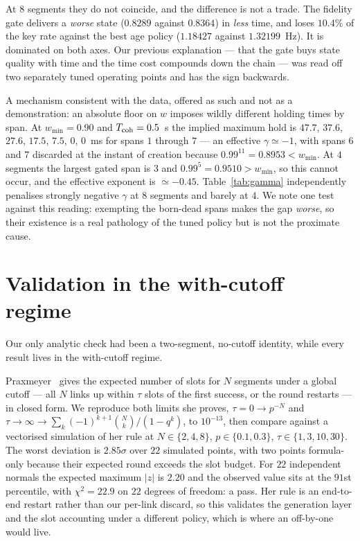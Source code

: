 \documentclass[aps,pra,twocolumn,superscriptaddress,floatfix,nofootinbib]{revtex4-2}
\begin{document}
At $8$ segments they do not coincide, and the difference is not a trade. The
fidelity gate delivers a \emph{worse} state ($0.8289$ against $0.8364$) in
\emph{less} time, and loses $10.4\%$ of the key rate against the best age policy
($1.18427$ against $1.32199$~Hz). It is dominated on both axes. Our previous
explanation --- that the gate buys state quality with time and the time cost
compounds down the chain --- was read off two separately tuned operating points
and has the sign backwards.

A mechanism consistent with the data, offered as such and not as a
demonstration: an absolute floor on $w$ imposes wildly different holding times
by span. At $w_{\min}=0.90$ and $T_{\rm coh}=0.5$~s the implied maximum hold is
$47.7$, $37.6$, $27.6$, $17.5$, $7.5$, $0$, $0$~ms for spans $1$ through $7$ ---
an effective $\gamma\simeq-1$, with spans $6$ and $7$ discarded at the instant
of creation because $0.99^{11} = 0.8953 < w_{\min}$. At $4$ segments the largest
gated span is $3$ and $0.99^{5} = 0.9510 > w_{\min}$, so this cannot occur, and
the effective exponent is $\simeq-0.45$. Table~\ref{tab:gamma} independently
penalises strongly negative $\gamma$ at $8$ segments and barely at $4$. We note
one test against this reading: exempting the born-dead spans makes the gap
\emph{worse}, so their existence is a real pathology of the tuned policy but is
not the proximate cause.

\section{Validation in the with-cutoff regime}

Our only analytic check had been a two-segment, no-cutoff identity, while every
result lives in the with-cutoff regime.

Praxmeyer~\cite{Praxmeyer2013} gives the expected number of slots for $N$
segments under a global cutoff --- all $N$ links up within $\tau$ slots of the
first success, or the round restarts --- in closed form. We reproduce both
limits she proves, $\tau=0\to p^{-N}$ and
$\tau\to\infty\to\sum_k(-1)^{k+1}\binom{N}{k}/(1-q^k)$, to $10^{-13}$, then
compare against a vectorised simulation of her rule at $N\in\{2,4,8\}$,
$p\in\{0.1,0.3\}$, $\tau\in\{1,3,10,30\}$. The worst deviation is $2.85\sigma$
over $22$ simulated points, with two points formula-only because their expected
round exceeds the slot budget. For $22$ independent normals the expected maximum
$|z|$ is $2.20$ and the observed value sits at the $91$st percentile, with
$\chi^2 = 22.9$ on $22$ degrees of freedom: a pass. Her rule is an end-to-end
restart rather than our per-link discard, so this validates the generation layer
and the slot accounting under a different policy, which is where an off-by-one
would live.
\end{document}
